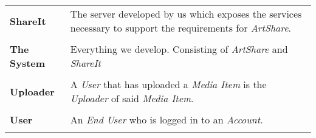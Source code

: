 \documentclass[../report.tex]{subfiles}
\begin{document}
\begin{longtable}{l p{10 cm}}
\textbf{ShareIt} & The server developed by us which exposes the services necessary to support the requirements for \textit{ArtShare}.\\ \\
\textbf{The System} & Everything we develop. Consisting of \textit{ArtShare} and \textit{ShareIt} \\ \\
\textbf{Uploader} & A \textit{User} that has uploaded a \textit{Media Item} is the \textit{Uploader} of said \textit{Media Item}. \\ \\
\textbf{User} & An \textit{End User} who is logged in to an \textit{Account}.\\ \\
\end{longtable}
\end{document}
